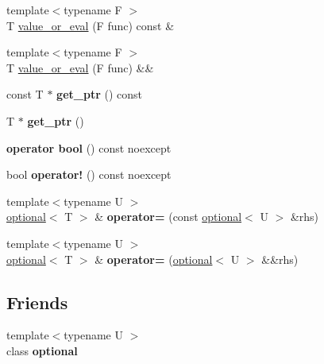 \begin{DoxyCompactItemize}
{\footnotesize template$<$typename F $>$ }\\T \hyperlink{classmcurses_1_1optional_a10bd1d21490f5ad196e3cdaa75e8fe5e}{value\+\_\+or\+\_\+eval} (F func) const \&
\item 
{\footnotesize template$<$typename F $>$ }\\T \hyperlink{classmcurses_1_1optional_a05c4a39a77de6c38df1dc8e93716d1c1}{value\+\_\+or\+\_\+eval} (F func) \&\&
\item 
\hypertarget{classmcurses_1_1optional_a1896dc22cf6eab26af66de6c0617cf09}{}\label{classmcurses_1_1optional_a1896dc22cf6eab26af66de6c0617cf09} 
const T $\ast$ {\bfseries get\+\_\+ptr} () const
\item 
\hypertarget{classmcurses_1_1optional_a3ec80c96fcf32503aa31055b2f15ec0a}{}\label{classmcurses_1_1optional_a3ec80c96fcf32503aa31055b2f15ec0a} 
T $\ast$ {\bfseries get\+\_\+ptr} ()
\item 
\hypertarget{classmcurses_1_1optional_ad201c997a97e54db8c12f6db62a639d3}{}\label{classmcurses_1_1optional_ad201c997a97e54db8c12f6db62a639d3} 
{\bfseries operator bool} () const noexcept
\item 
\hypertarget{classmcurses_1_1optional_ae20826df69fbe919760e00f45f2a2b13}{}\label{classmcurses_1_1optional_ae20826df69fbe919760e00f45f2a2b13} 
bool {\bfseries operator!} () const noexcept
\item 
\hypertarget{classmcurses_1_1optional_a13e4a4e6a551c8babfa8eb63ee3c521a}{}\label{classmcurses_1_1optional_a13e4a4e6a551c8babfa8eb63ee3c521a} 
{\footnotesize template$<$typename U $>$ }\\\hyperlink{classmcurses_1_1optional}{optional}$<$ T $>$ \& {\bfseries operator=} (const \hyperlink{classmcurses_1_1optional}{optional}$<$ U $>$ \&rhs)
\item 
\hypertarget{classmcurses_1_1optional_aeff9d68584f9c925dfe9cb06c152d49a}{}\label{classmcurses_1_1optional_aeff9d68584f9c925dfe9cb06c152d49a} 
{\footnotesize template$<$typename U $>$ }\\\hyperlink{classmcurses_1_1optional}{optional}$<$ T $>$ \& {\bfseries operator=} (\hyperlink{classmcurses_1_1optional}{optional}$<$ U $>$ \&\&rhs)
\end{DoxyCompactItemize}
\subsection*{Friends}
\begin{DoxyCompactItemize}
\item 
\hypertarget{classmcurses_1_1optional_aa756d67787488b1e2bba885ce4da6fe0}{}\label{classmcurses_1_1optional_aa756d67787488b1e2bba885ce4da6fe0} 
{\footnotesize template$<$typename U $>$ }\\class {\bfseries optional}
\end{DoxyCompactItemize}


